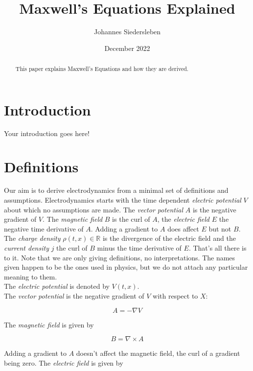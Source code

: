 \documentclass{article}
\title{Maxwell's Equations Explained}
\author{Johannes Siedersleben}
\date{December 2022}
\begin{document}
\maketitle

\begin{abstract}
This paper explains Maxwell's Equations and how they are derived.
\end{abstract}

\section{Introduction}

Your introduction goes here!

\section{Definitions}
Our aim is to derive electrodynamics from a minimal set of definitions and assumptions. Electrodynamics starts with the time dependent \emph{electric potential} $V$ about which no assumptions are made. The \emph{vector potential} $A$ is the negative gradient of $V$. The \emph{magnetic field} $B$ is the curl of $A$, the \emph{electric field} $E$ the negative time derivative of $A$.  Adding a gradient to $A$ does affect $E$ but not $B$. The \emph{charge density} $\rho(t, x) \in \mathbb{R}$ is the divergence of the electric field and the \emph{current density} $j$ the curl of $B$ minus the time derivative of $E$. That's all there is to it. Note that we are only giving definitions, no interpretations. The names given happen to be the ones used in physics, but we do not attach any particular meaning to them. \\

The \emph{electric potential} is denoted by \(V(t, x)\). \\

The \emph{vector potential} is the negative gradient of $V$ with respect to $X$:

\begin{equation} \label{eq:vector_potential}
A = -\nabla V
\end{equation}

The \emph{magnetic field} is given by

\begin{equation} \label{eq:magnetic_field}
B = \nabla \times A
\end{equation}

Adding a gradient to $A$ doesn't affect the magnetic field, the curl of a gradient being zero. The \emph{electric field} is given by
\end{document}
